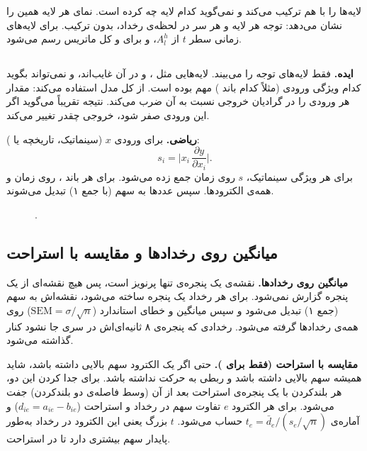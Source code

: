  لایه‌ها را با هم ترکیب می‌کند و نمی‌گوید کدام لایه چه کرده است. نمای هر لایه همین را نشان می‌دهد: توجه هر لایه و هر سر در لحظه‌ی رخداد، بدون ترکیب. برای لایه‌های زمانی سطر $t$ از $A^{h}_l$، و برای  و  کل ماتریس رسم می‌شود.

\subsection{}

\textbf{ایده.}  فقط لایه‌های توجه را می‌بیند. لایه‌هایی مثل ،  و  در آن غایب‌اند، و  نمی‌تواند بگوید کدام ویژگی ورودی (مثلاً کدام باند ) مهم بوده است.  \cite{shrikumar2016} از کل مدل استفاده می‌کند: مقدار هر ورودی را در گرادیان خروجی نسبت به آن ضرب می‌کند. نتیجه تقریباً می‌گوید اگر این ورودی صفر شود، خروجی چقدر تغییر می‌کند.

\textbf{ریاضی.} برای ورودی $x$ (سینماتیک، تاریخچه یا  ):
\begin{equation}
s_i=\Big|x_i\,\frac{\partial y}{\partial x_i}\Big|.
\end{equation}
برای هر ویژگی سینماتیک، $s$ روی زمان جمع زده می‌شود. برای هر باند ، روی زمان و همه‌ی الکترودها. سپس عددها به سهم (با جمع ۱) تبدیل می‌شوند.

\begin{figure}[htbp]
\centering

\caption{.}
\end{figure}

\subsection{میانگین روی رخدادها و مقایسه با استراحت}

\textbf{میانگین روی رخدادها.} نقشه‌ی یک پنجره‌ی تنها پرنویز است، پس هیچ نقشه‌ای از یک پنجره گزارش نمی‌شود. برای هر رخداد یک پنجره ساخته می‌شود، نقشه‌اش به سهم (جمع ۱) تبدیل می‌شود و سپس میانگین و خطای استاندارد ($\mathrm{SEM}=\sigma/\sqrt n$) روی همه‌ی رخدادها گرفته می‌شود. رخدادی که پنجره‌ی ۸ ثانیه‌ای‌اش در سری جا نشود کنار گذاشته می‌شود.

\textbf{مقایسه با استراحت (فقط برای ).} حتی اگر یک الکترود سهم بالایی داشته باشد، شاید همیشه سهم بالایی داشته باشد و ربطی به حرکت نداشته باشد. برای جدا کردن این دو، هر بلندکردن با یک پنجره‌ی استراحت بعد از آن (وسط فاصله‌ی دو بلندکردن) جفت می‌شود. برای هر الکترود $e$ تفاوت سهم در رخداد و استراحت ($d_{ie}=a_{ie}-b_{ie}$) و آماره‌ی $t_e=\bar d_e/(s_e/\sqrt n)$ حساب می‌شود. $t$ بزرگ یعنی این الکترود در رخداد به‌طور پایدار سهم بیشتری دارد تا در استراحت.

